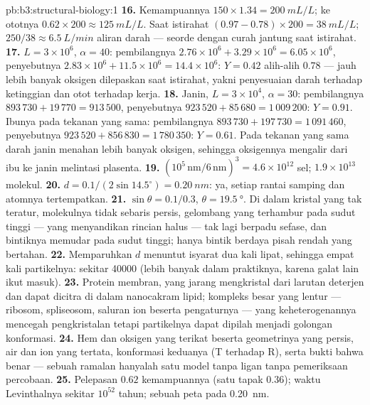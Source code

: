 \begin{solution}{pb:b3:structural-biology:1}
\textbf{16.} Kemampuannya $150\times 1.34 = \qty{200}{mL/L}$; ke ototnya
$0.62\times 200 \approx \qty{125}{mL/L}$. Saat istirahat $(0.97 - 0.78)\times
200 = \qty{38}{mL/L}$; $250/38 \approx \qty{6.5}{L/min}$ aliran
darah --- seorde dengan curah jantung saat istirahat.
\textbf{17.} $L = 3\times 10^{6}$, $\alpha = 40$: pembilangnya $2.76\times
10^{6} + 3.29\times 10^{6} = 6.05\times 10^{6}$, penyebutnya $2.83\times
10^{6} + 11.5\times 10^{6} = 14.4\times 10^{6}$: $Y = 0.42$ alih-alih
$0.78$ --- jauh lebih banyak oksigen dilepaskan saat istirahat, yakni
penyesuaian darah terhadap ketinggian dan otot terhadap kerja.
\textbf{18.} Janin, $L = 3\times 10^{4}$, $\alpha = 30$: pembilangnya
$893\,730 + 19\,770 = 913\,500$, penyebutnya $923\,520 + 85\,680 =
1\,009\,200$: $Y = 0.91$. Ibunya pada tekanan yang sama: pembilangnya
$893\,730 + 197\,730 = 1\,091\,460$, penyebutnya $923\,520 + 856\,830
= 1\,780\,350$: $Y = 0.61$. Pada tekanan yang sama darah janin menahan lebih
banyak oksigen, sehingga oksigennya mengalir dari ibu ke janin melintasi plasenta.
\textbf{19.} $(10^{5}\,\text{nm}/6\,\text{nm})^{3} = 4.6\times 10^{12}$
sel; $1.9\times 10^{13}$ molekul.
\textbf{20.} $d = 0.1/(2\sin 14.5^{\circ}) = \qty{0.20}{nm}$: ya,
setiap rantai samping dan atomnya tertempatkan.
\textbf{21.} $\sin\theta = 0.1/0.3$, $\theta = \qty{19.5}{\degree}$. Di
dalam kristal yang tak teratur, molekulnya tidak sebaris persis, gelombang
yang terhambur pada sudut tinggi --- yang menyandikan rincian halus --- tak
lagi berpadu sefase, dan bintiknya memudar pada sudut tinggi; hanya bintik
berdaya pisah rendah yang bertahan.
\textbf{22.} Memparuhkan $d$ menuntut isyarat dua kali lipat, sehingga empat
kali partikelnya: sekitar \num{40000} (lebih banyak dalam praktiknya, karena
galat lain ikut masuk).
\textbf{23.} Protein membran, yang jarang mengkristal dari larutan deterjen
dan dapat dicitra di dalam nanocakram lipid; kompleks besar yang lentur ---
ribosom, spliseosom, saluran ion beserta pengaturnya --- yang
keheterogenannya mencegah pengkristalan tetapi partikelnya dapat dipilah
menjadi golongan konformasi.
\textbf{24.} Hem dan oksigen yang terikat beserta geometrinya yang persis,
air dan ion yang tertata, konformasi keduanya (T terhadap R), serta bukti
bahwa  benar --- sebuah ramalan hanyalah satu model tanpa ligan
tanpa pemeriksaan percobaan.
\textbf{25.} Pelepasan $0.62$ kemampuannya (satu tapak $0.36$); waktu
Levinthalnya sekitar $10^{52}$ tahun; sebuah peta pada \qty{0.20}{nm}.
\end{solution}
